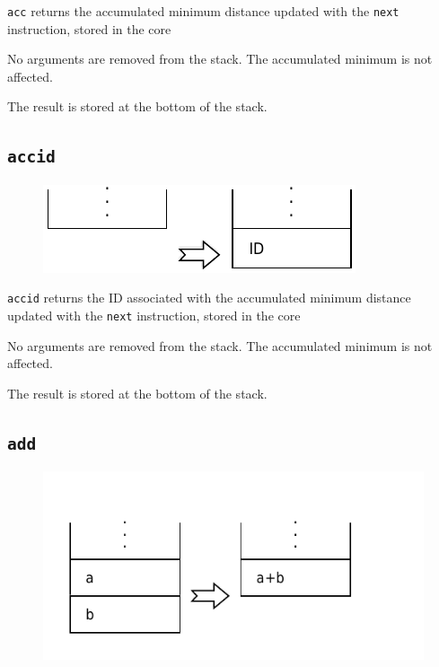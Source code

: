 			\texttt{acc} returns the accumulated minimum distance updated with
			the \texttt{next} instruction, stored in the core
			
			No arguments are removed from the stack. The accumulated minimum is
			not affected.
			
			The result is stored at the bottom of the stack.
	
	\qquad
	
	\subsection*{\texttt{accid}}
	
		\begin{figure}
			\begin{flushright}
				\includegraphics[width=\linewidth]{figure/pdf/i_accid} 
			\end{flushright}
		\end{figure}
	
			\texttt{accid} returns the ID associated with the accumulated
			minimum distance updated with the \texttt{next} instruction, stored
			in the core
			
			No arguments are removed from the stack. The accumulated minimum is
			not affected.
			
			The result is stored at the bottom of the stack.
	
	\qquad
	
\newpage

	\subsection*{\texttt{add}}
	
		\begin{figure}
			\begin{flushright}
				\includegraphics[width=\linewidth]{figure/pdf/i_add} 
			\end{flushright}
		\end{figure}
	
